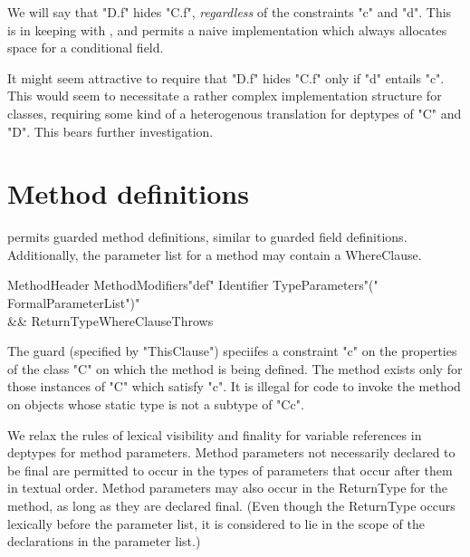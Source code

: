 We will say that \xcd"D.f" hides \xcd"C.f", {\em regardless} of the
constraints \xcd"c" and \xcd"d". This is in keeping with \Java, and
permits a naive implementation which always allocates space for a
conditional field.

\begin{rationale}
It might seem attractive to require that \xcd"D.f"
hides \xcd"C.f" only if \xcd"d" entails \xcd"c". This would seem
to necessitate a rather complex implementation structure for classes,
requiring some kind of a heterogenous translation for deptypes of \xcd"C"
and \xcd"D". This bears further investigation.
\end{rationale}

\section{Method definitions}

\Xten{} permits guarded method definitions, similar to guarded
field definitions. Additionally, the parameter list for a method may
contain a WhereClause.

\begin{grammar}
MethodHeader \:  
  MethodModifiers\opt \xcd"def" Identifier TypeParameters\opt \xcd"("
  FormalParameterList\opt \xcd")" \\
  && ReturnType\opt WhereClause\opt Throws\opt
\end{grammar}

The guard (specified by \xcd"ThisClause") speciifes a constraint \xcd"c" on the
properties of the class \xcd"C" on which the method is being defined. The
method exists only for those instances of \xcd"C" which satisfy \xcd"c".  It is
illegal for code to invoke the method on objects whose static type is
not a subtype of \xcd"C{c}".

We relax the rules of lexical visibility and finality for variable
references in deptypes for method parameters.  Method
parameters not necessarily declared to be final are permitted to occur
in the types of parameters that occur after them in textual
order. Method parameters may also occur in the ReturnType for the
method, as long as they are declared final. (Even though the ReturnType
occurs lexically before the parameter list, it is considered to lie in
the scope of the declarations in the parameter list.)

